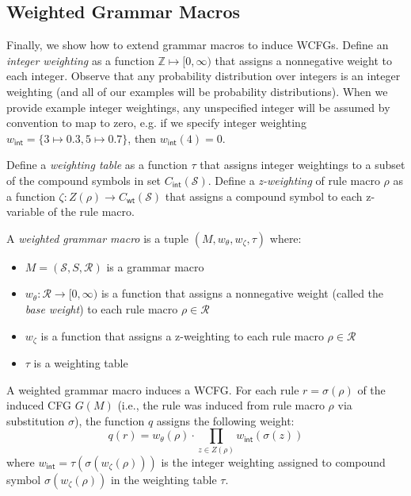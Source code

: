 \documentclass[11pt,a4paper]{article}
\begin{document}
\subsection{Weighted Grammar Macros}

Finally, we show how to extend grammar macros to induce WCFGs. Define an \emph{integer weighting} as a function $\mathbb{Z} \mapsto [0,\infty)$ that assigns a nonnegative weight to each integer. Observe that any probability distribution over integers is an integer weighting (and all of our examples will be probability distributions). When we provide example integer weightings, any unspecified integer will be assumed by convention to map to zero, e.g. if we specify integer weighting $w_\mathsf{int} = \{3 \mapsto 0.3, 5 \mapsto 0.7\}$, then $w_\mathsf{int}(4) = 0$.

Define a \emph{weighting table} as a function $\tau$ that assigns integer weightings to a subset of the compound symbols in set $C_{\mathsf{int}}(\mathcal{S})$. Define a \emph{z-weighting} of rule macro $\rho$ as a function $\zeta: Z(\rho) \rightarrow C_{\mathsf{wt}}(\mathcal{S})$ that assigns a compound symbol to each z-variable of the rule macro.

A \emph{weighted grammar macro} is a tuple $(M, w_\theta, w_\zeta, \tau)$ where:
\begin{itemize}
	\item $M = (\mathcal{S}, S, \mathcal{R})$ is a grammar macro
	\item $w_\theta: \mathcal{R} \rightarrow [0,\infty)$ is a function that assigns a nonnegative weight (called the \emph{base weight}) to each rule macro $\rho \in \mathcal{R}$
	\item $w_\zeta$ is a function that assigns a z-weighting to each rule macro $\rho \in \mathcal{R}$
	\item $\tau$ is a weighting table
\end{itemize}

A weighted grammar macro induces a WCFG. For each rule $r = \sigma(\rho)$ of the induced CFG $G(M)$ (i.e., the rule was induced from rule macro $\rho$ via substitution $\sigma$), the function $q$ assigns the following weight:
\begin{equation*}
	q(r) = w_\theta(\rho) \cdot \prod\limits_{z \in Z(\rho)} w_\mathsf{int}(\sigma(z))
\end{equation*}
\noindent where $w_\mathsf{int} = \tau(\sigma(w_\zeta(\rho)))$ is the integer weighting assigned to compound symbol $\sigma(w_\zeta(\rho))$ in the weighting table $\tau$.
\end{document}
